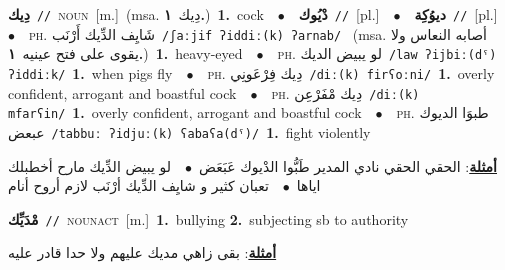 \documentclass[10pt,a4paper,twoside]{article} %
\begin{document}
\begin{multicols}{2}
{\setlength\topsep{0pt}\textbf{\foreignlanguage{arabic}{دِيك}}\ {\color{gray}\texttt{//}\color{black}}\ \textsc{noun}\ [m.]\ \color{gray}(msa. \foreignlanguage{arabic}{دِيك}~\foreignlanguage{arabic}{\textbf{١.}})\color{black}\ \textbf{1.}~cock\ \ $\bullet$\ \ \setlength\topsep{0pt}\textbf{\foreignlanguage{arabic}{دْيُوك}}\ {\color{gray}\texttt{//}\color{black}}\ [pl.]\ \ $\bullet$\ \ \setlength\topsep{0pt}\textbf{\foreignlanguage{arabic}{ديوُكِة}}\ {\color{gray}\texttt{//}\color{black}}\ [pl.]\ \ $\bullet$\ \ \textsc{ph.} \color{gray} \foreignlanguage{arabic}{شَايِف الدِّيك أَرْنَب}\color{black}\ {\color{gray}\texttt{/{\sffamily ʃaːjif ʔiddiː(k) ʔarnab}/}\color{black}}\ \color{gray} (msa. \foreignlanguage{arabic}{أصابه النعاس ولا يقوى على فتح عينيه}~\foreignlanguage{arabic}{\textbf{١.}})\color{black}\ \textbf{1.}~heavy-eyed\ \ $\bullet$\ \ \textsc{ph.} \color{gray} \foreignlanguage{arabic}{لو يبيض الديك}\color{black}\ {\color{gray}\texttt{/{\sffamily law ʔijbiː(dˤ) ʔiddiːk}/}\color{black}}\ \textbf{1.}~when pigs fly\ \ $\bullet$\ \ \textsc{ph.} \color{gray} \foreignlanguage{arabic}{دِيك فِرْعَونِي}\color{black}\ {\color{gray}\texttt{/{\sffamily diː(k) firʕoːni}/}\color{black}}\ \textbf{1.}~overly confident, arrogant and boastful cock\ \ $\bullet$\ \ \textsc{ph.} \color{gray} \foreignlanguage{arabic}{دِيك مْفَرْعِن}\color{black}\ {\color{gray}\texttt{/{\sffamily diː(k) mfarʕin}/}\color{black}}\ \textbf{1.}~overly confident, arrogant and boastful cock\ \ $\bullet$\ \ \textsc{ph.} \color{gray} \foreignlanguage{arabic}{طبوَا الديوك عبعض}\color{black}\ {\color{gray}\texttt{/{\sffamily tabbuː ʔidjuː(k) ʕabaʕa(dˤ)}/}\color{black}}\ \textbf{1.}~fight violently\  \begin{flushright}\color{gray}\foreignlanguage{arabic}{\textbf{\underline{\foreignlanguage{arabic}{أمثلة}}}: الحقي الحقي نادي المدير طَبُّوا الدْيوك عَبَعَض\ $\bullet$\ \  لو يبيض الدِّيك مارح أخطبلك اياها\ $\bullet$\ \  تعبان كثير و شايِف الدِّيك أرْنَب لازم أروح أنام}\end{flushright}\color{black}} \vspace{2mm}

{\setlength\topsep{0pt}\textbf{\foreignlanguage{arabic}{مْدَيِّك}}\ {\color{gray}\texttt{//}\color{black}}\ \textsc{noun\textunderscore act}\ [m.]\ \textbf{1.}~bullying  \textbf{2.}~subjecting sb to authority\  \begin{flushright}\color{gray}\foreignlanguage{arabic}{\textbf{\underline{\foreignlanguage{arabic}{أمثلة}}}: بقى زاهي مديك عليهم ولا حدا قادر عليه}\end{flushright}\color{black}} \vspace{2mm}


\end{multicols}
\end{document}

